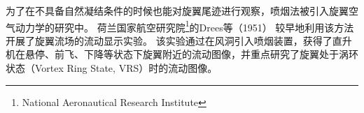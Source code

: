\documentclass[doctor,openright,twoside,color]{buaathesis}
\begin{document}
为了在不具备自然凝结条件的时候也能对旋翼尾迹进行观察，喷烟法被引入旋翼空气动力学的研究中。
荷兰国家航空研究院\footnote{National Aeronautical Research Institute}的Drees等（1951）
较早地利用该方法开展了旋翼流场的流动显示实验。
该实验通过在风洞引入喷烟装置，获得了直升机在悬停、前飞、下降等状态下旋翼附近的流动图像，并重点研究了旋翼处于涡环状态（Vortex Ring State, VRS）时的流动图像。
\begin{figure}[t!]
\begin{floatrow}
\end{floatrow}
\end{figure}
\end{document}
